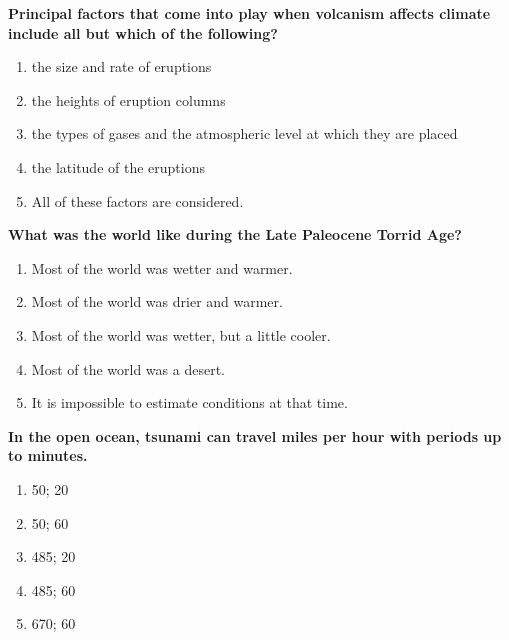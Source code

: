 \item {
\setlength{\itemsep}{0cm}
\setlength{\parskip}{.2cm}
\begin{samepage}
\textbf{
Principal factors that come into play when volcanism affects climate include all but which of the following?
}
\begin{enumerate}
\item {  the size and rate of eruptions }
\item {  the heights of eruption columns }
\item {  the types of gases and the atmospheric level at which they are placed }
\item {  the latitude of the eruptions }
\item {  All of these factors are considered. }
\end{enumerate}
\end{samepage}
}
\item {
\setlength{\itemsep}{0cm}
\setlength{\parskip}{.2cm}
\begin{samepage}
\textbf{
What was the world like during the Late Paleocene Torrid Age? 
}
\begin{enumerate}
\item {  Most of the world was wetter and warmer. }
\item {  Most of the world was drier and warmer. }
\item {  Most of the world was wetter, but a little cooler. }
\item {  Most of the world was a desert. }
\item {  It is impossible to estimate conditions at that time. }
\end{enumerate}
\end{samepage}
}
\item {
\setlength{\itemsep}{0cm}
\setlength{\parskip}{.2cm}
\begin{samepage}
\textbf{
In the open ocean, tsunami can travel \makebox[1cm]{\Rivpt\hrulefill\Rivpt} miles per hour with periods up to \makebox[1cm]{\Rivpt\hrulefill\Rivpt} minutes.
}
\begin{enumerate}
\item { 	50; 20 }
\item { 	50; 60 }
\item { 	485; 20 }
\item { 	485; 60 }
\item { 	670; 60 		 }
\end{enumerate}
\end{samepage}
}
